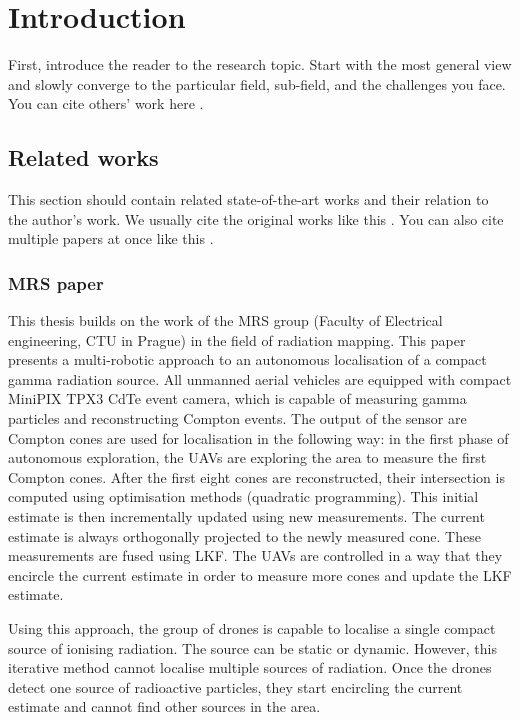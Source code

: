 
\chapter{Introduction\label{chap:introduction}}

First, introduce the reader to the research topic.
Start with the most general view and slowly converge to the particular field, sub-field, and the challenges you face.
You can cite others' work here \cite{baca2021mrs}.

\section{Related works}

This section should contain related state-of-the-art works and their relation to the author's work.
We usually cite the original works like this \cite{benallegue2008high}.
You can also cite multiple papers at once like this \cite{baca2016embedded, baca2021mrs}.




\subsection{ MRS paper}
This thesis builds on the work of the MRS group (Faculty of Electrical engineering, CTU in Prague) in the field of radiation mapping. 
This paper \cite{baca2021gamma} presents a multi-robotic approach to an autonomous localisation of a compact gamma radiation source. 
All unmanned aerial vehicles are equipped with compact MiniPIX TPX3 CdTe event camera, which is capable of measuring gamma particles and reconstructing Compton events. 
The output of the sensor are Compton cones are used for localisation in the following way:
in the first phase of autonomous exploration, the \ac{UAV}s are exploring the area to measure the first Compton cones. 
After the first eight cones are reconstructed, their intersection is computed using optimisation methods (quadratic programming). 
This initial estimate is then incrementally updated using new measurements. 
The current estimate is always orthogonally projected to the newly measured cone. 
These measurements are fused using \ac{LKF}. 
The \ac{UAV}s are controlled in a way that they encircle the current estimate in order to measure more cones and update the \ac{LKF} estimate.

Using this approach, the group of drones is capable to localise a single compact source of ionising radiation. 
The source can be static or dynamic. 
However, this iterative method cannot localise multiple sources of radiation.
Once the drones detect one source of radioactive particles, they start encircling the current estimate and cannot find other sources in the area.

